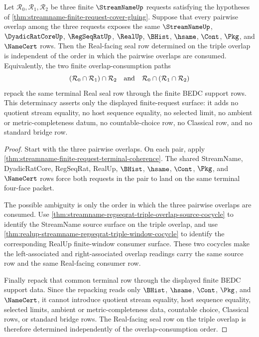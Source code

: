 \begin{theorem}
\label{thm:streamname-finite-request-real-seal-cocycle-determinacy}
Let $\mathcal{R}_0,\mathcal{R}_1,\mathcal{R}_2$ be three finite
$\StreamNameUp$ requests satisfying the hypotheses of
\autoref{thm:streamname-finite-request-cover-gluing}. Suppose that every
pairwise overlap among the three requests exposes the same $\StreamNameUp$,
$\DyadicRatCoreUp$, $\RegSeqRatUp$, $\RealUp$, $\BHist$, $\hsame$, $\Cont$,
$\Pkg$, and $\NameCert$ rows. Then the Real-facing seal row determined on the
triple overlap is independent of the order in which the pairwise overlaps are
consumed. Equivalently, the two finite overlap-consumption paths
$$
(\mathcal{R}_0\cap\mathcal{R}_1)\cap\mathcal{R}_2
\quad\hbox{and}\quad
\mathcal{R}_0\cap(\mathcal{R}_1\cap\mathcal{R}_2)
$$
repack the same terminal Real seal row through the finite BEDC support rows.
This determinacy asserts only the displayed finite-request surface: it adds
no quotient stream equality, no host sequence equality, no selected limit, no
ambient or metric-completeness datum, no countable-choice row, no Classical
row, and no standard bridge row.
\end{theorem}
\begin{proof}
Start with the three pairwise overlaps. On each pair, apply
\autoref{thm:streamname-finite-request-terminal-coherence}. The shared
StreamName, DyadicRatCore, RegSeqRat, RealUp, $\BHist$, $\hsame$, $\Cont$,
$\Pkg$, and $\NameCert$ rows force both requests in the pair to land on the
same terminal four-face packet.

The possible ambiguity is only the order in which the three pairwise
overlaps are consumed. Use
\autoref{thm:streamname-regseqrat-triple-overlap-source-cocycle} to identify
the StreamName source surface on the triple overlap, and use
\autoref{thm:realup-streamname-regseqrat-triple-window-cocycle} to identify
the corresponding RealUp finite-window consumer surface. These two cocycles
make the left-associated and right-associated overlap readings carry the same
source row and the same Real-facing consumer row.

Finally repack that common terminal row through the displayed finite BEDC
support data. Since the repacking reads only $\BHist$, $\hsame$, $\Cont$,
$\Pkg$, and $\NameCert$, it cannot introduce quotient stream equality, host
sequence equality, selected limits, ambient or metric-completeness data,
countable choice, Classical rows, or standard bridge rows. The Real-facing
seal row on the triple overlap is therefore determined independently of the
overlap-consumption order.
\end{proof}

